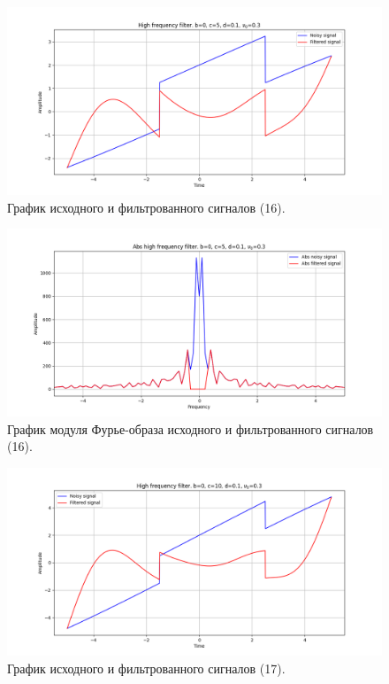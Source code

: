 \documentclass[a4paper, 12pt]{article}
\begin{document}
    \begin{figure}[!htb]
        \centering
        \includegraphics[scale=0.48]{16_u_flt_u_nolow.png}
        \captionsetup{skip=0pt}
        \caption{График исходного и фильтрованного сигналов (16).}
        \label{fig:fig57}
    \end{figure}
    \begin{figure}[!htb]
        \centering
        \includegraphics[scale=0.48]{16_abs_u_U_nolow.png}
        \captionsetup{skip=0pt}
        \caption{График модуля Фурье-образа исходного и фильтрованного сигналов (16).}
        \label{fig:fig58}
    \end{figure}
    \newpage
    \begin{figure}[!htb]
        \centering
        \includegraphics[scale=0.48]{17_u_flt_u_nolow.png}
        \captionsetup{skip=0pt}
        \caption{График исходного и фильтрованного сигналов (17).}
        \label{fig:fig59}
    \end{figure}
\end{document}
